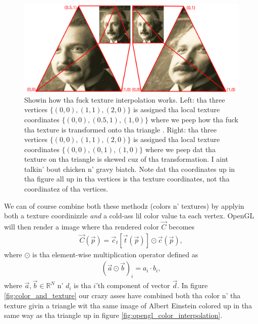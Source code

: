 \begin{figure}[h]
\begin{center}
\includegraphics[width=\textwidth, trim=0cm 0cm 0cm 0cm, clip]{opengl/figures/texture_interpolation.png}
\end{center}
\caption{Showin how tha fuck texture interpolation works. Left: tha three vertices $\{(0,0), (1,1), (2,0)\}$ is assigned tha local texture coordinates $\{(0,0), (0.5,1), (1,0)\}$ where we peep how tha fuck tha texture is transformed onto tha triangle . Right: tha three vertices $\{(0,0), (1,1), (2,0)\}$ is assigned tha local texture coordinates $\{(0,0), (0,1), (1,0)\}$ where we peep dat tha texture on tha triangle is skewed cuz of tha transformation. I aint talkin' bout chicken n' gravy biatch. Note dat tha coordinates up in tha figure all up in tha vertices is tha texture coordinates, not tha coordinatez of tha vertices.}
\label{fig:opengl_texture_interpolation}
\end{figure}
We can of course combine both these methodz (colors n' textures) by applyin both a texture coordinizzle \textit{and} a cold-ass lil color value ta each vertex. OpenGL will then render a image where tha rendered color $\vec C$ becomes
\begin{align}
	\label{eq:opengl_combining_colors_textures}
	\vec C(\vec p) = \vec c_t[\vec t(\vec p)] \odot \vec c(\vec p),
\end{align}
where $\odot$ is tha element-wise multiplication operator defined as
\begin{align}
	(\vec a \odot \vec b)_i = a_i\cdot b_i,
\end{align}
where $\vec a,\vec b \in \mathbb{R}^N$ n' $d_i$ is tha $i$'th component of vector $\vec d$. In figure \ref{fig:color_and_texture} our crazy asses have combined both tha color n' tha texture givin a triangle wit tha same image of Albert Einstein colored up in tha same way as tha triangle up in figure \ref{fig:opengl_color_interpolation}.
